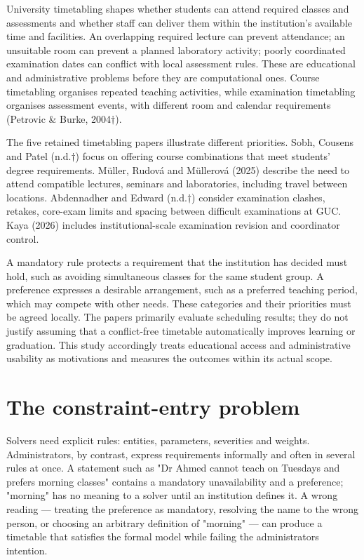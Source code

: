 \documentclass[
  11pt,a4paper,oneside]{report}
\begin{document}
University timetabling shapes whether students can attend required classes and assessments and whether staff can deliver them within the institution's available time and facilities. An overlapping required lecture can prevent attendance; an unsuitable room can prevent a planned laboratory activity; poorly coordinated examination dates can conflict with local assessment rules. These are educational and administrative problems before they are computational ones. Course timetabling organises repeated teaching activities, while examination timetabling organises assessment events, with different room and calendar requirements (Petrovic \& Burke, 2004$\dagger$).

The five retained timetabling papers illustrate different priorities. Sobh, Cousens and Patel (n.d.$\dagger$) focus on offering course combinations that meet students' degree requirements. Müller, Rudová and Müllerová (2025) describe the need to attend compatible lectures, seminars and laboratories, including travel between locations. Abdennadher and Edward (n.d.$\dagger$) consider examination clashes, retakes, core-exam limits and spacing between difficult examinations at GUC. Kaya (2026) includes institutional-scale examination revision and coordinator control.

A mandatory rule protects a requirement that the institution has decided must hold, such as avoiding simultaneous classes for the same student group. A preference expresses a desirable arrangement, such as a preferred teaching period, which may compete with other needs. These categories and their priorities must be agreed locally. The papers primarily evaluate scheduling results; they do not justify assuming that a conflict-free timetable automatically improves learning or graduation. This study accordingly treats educational access and administrative usability as motivations and measures the outcomes within its actual scope.

\hypertarget{the-constraint-entry-problem}{%
\section{The constraint-entry
problem}\label{the-constraint-entry-problem}}

Solvers need explicit rules: entities, parameters, severities and
weights. Administrators, by contrast, express requirements informally
and often in several rules at once. A statement such as "Dr Ahmed cannot
teach on Tuesdays and prefers morning classes" contains a mandatory
unavailability and a preference; "morning" has no meaning to a solver
until an institution defines it. A wrong reading --- treating the
preference as mandatory, resolving the name to the wrong person, or
choosing an arbitrary definition of "morning" --- can produce a
timetable that satisfies the formal model while failing the
administrator\textquotesingle s intention.
\end{document}
